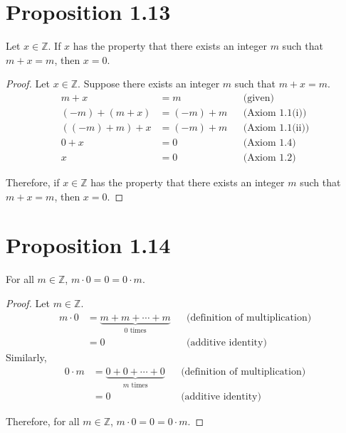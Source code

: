\section*{Proposition 1.13}
Let $x \in \mathbb{Z}$. If $x$ has the property that there exists an integer $m$ such that $m+x = m$, then $x = 0$.
\begin{proof}
    Let $x \in \mathbb{Z}$. Suppose there exists an integer $m$ such that $m + x = m$.
    \begin{align*}
        m + x          & = m        &  & \text{(given)}         \\
        (-m) + (m + x) & = (-m) + m &  & \text{(Axiom 1.1(i))}  \\
        ((-m) + m) + x & = (-m) + m &  & \text{(Axiom 1.1(ii))} \\
        0 + x          & = 0        &  & \text{(Axiom 1.4)}     \\
        x              & = 0        &  & \text{(Axiom 1.2)}
    \end{align*}

    Therefore, if $x \in \mathbb{Z}$ has the property that there exists an integer $m$ such that $m + x = m$, then $x = 0$.
\end{proof}

\section*{Proposition 1.14}
For all $m \in \mathbb{Z}$, $m \cdot 0 = 0 = 0 \cdot m$.
\begin{proof}
    Let $m \in \mathbb{Z}$.
    \begin{align*}
        m \cdot 0 & = \underbrace{m + m + \cdots + m}_{0 \text{ times}} &  & \text{(definition of multiplication)} \\
                  & = 0                                                 &  & \text{(additive identity)}
    \end{align*}
    Similarly,
    \begin{align*}
        0 \cdot m & = \underbrace{0 + 0 + \cdots + 0}_{m \text{ times}} &  & \text{(definition of multiplication)} \\
                  & = 0                                                 &  & \text{(additive identity)}
    \end{align*}

    Therefore, for all $m \in \mathbb{Z}$, $m \cdot 0 = 0 = 0 \cdot m$.
\end{proof}

